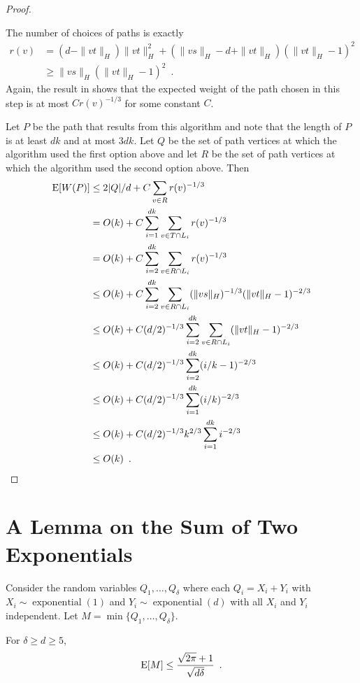 \documentclass{patmorin}
\DeclareMathOperator{\exponential}{exponential}
\begin{document}
\begin{proof}
\begin{enumerate}
    The number of choices of paths is exactly
    \begin{align*}
        r(v) & = (d-\|vt\|_H)\|vt\|_H^2 
               + (\|vs\|_H-d+\|vt\|_H)(\|vt\|_H-1)^2 \\
             & \ge \|vs\|_H(\|vt\|_H-1)^2 \enspace .
    \end{align*}
    Again, the result in  shows that the expected
    weight of the path chosen in this step is at most $Cr(v)^{-1/3}$
    for some constant $C$.
\end{enumerate}
Let $P$ be the path that results from this algorithm and note that the
length of $P$ is at least $dk$ and at most $3dk$.  Let $Q$ be the set of
path vertices at which the algorithm used the first option above and let
$R$ be the set of path vertices at which the algorithm used the second
option above.  Then
\begin{align*}
    \mathrm{E}[W(P)] & \le 2|Q|/d + C\sum_{v\in R}r(v)^{-1/3} \\
             & = O(k) + C\sum_{i=1}^{dk}\sum_{v\in T\cap L_i}r(v)^{-1/3} \\
             & = O(k) + C\sum_{i=2}^{dk}\sum_{v\in R\cap L_i}r(v)^{-1/3} \\
             & \le O(k) + C\sum_{i=2}^{dk}\sum_{v\in R\cap L_i}(\|vs\|_H)^{-1/3}(\|vt\|_H-1)^{-2/3} \\
             & \le O(k) + C(d/2)^{-1/3}\sum_{i=2}^{dk}\sum_{v\in R\cap L_i}(\|vt\|_H-1)^{-2/3} \\
             & \le O(k) +  C(d/2)^{-1/3}\sum_{i=2}^{dk}(i/k-1)^{-2/3} \\
             & \le O(k) +  C(d/2)^{-1/3}\sum_{i=1}^{dk}(i/k)^{-2/3} \\
             & \le O(k) +  C(d/2)^{-1/3}k^{2/3}\sum_{i=1}^{dk}i^{-2/3} \\
             & \le O(k) \enspace . \qedhere
\end{align*}
\end{proof}

\section{A Lemma on the Sum of Two Exponentials}

Consider the random variables $Q_1,\ldots,Q_\delta$ where each
$Q_i=X_i+Y_i$ with $X_i\sim\exponential(1)$ and $Y_i\sim\exponential(d)$
with all $X_i$ and $Y_i$ independent.  Let $M=\min\{Q_1,\ldots,Q_\delta\}$.

\begin{lem}
   For $\delta\ge d \ge 5$, 
   \[  \mathrm{E}[M] \le \frac{\sqrt{2\pi} + 1}{\sqrt{d\delta}} \enspace . \]
\end{lem}
\end{document}
